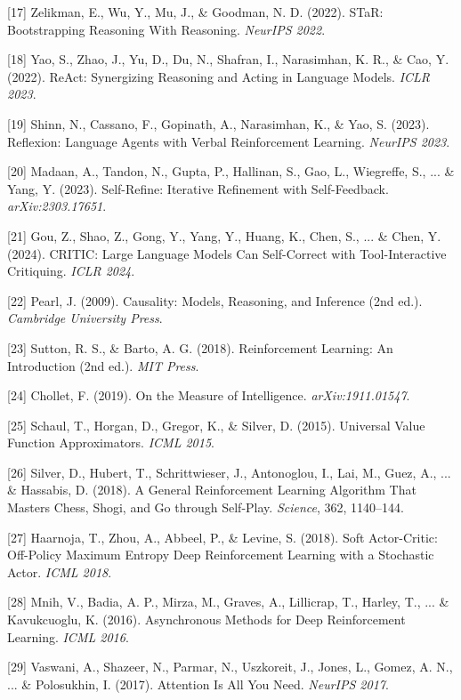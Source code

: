 \documentclass[11pt]{article}
\begin{document}
[17] Zelikman, E., Wu, Y., Mu, J., \& Goodman, N. D. (2022). STaR: Bootstrapping
    Reasoning With Reasoning. \textit{NeurIPS 2022}.

[18] Yao, S., Zhao, J., Yu, D., Du, N., Shafran, I., Narasimhan, K. R., \& Cao, Y.
    (2022). ReAct: Synergizing Reasoning and Acting in Language Models.
    \textit{ICLR 2023}.

[19] Shinn, N., Cassano, F., Gopinath, A., Narasimhan, K., \& Yao, S. (2023).
    Reflexion: Language Agents with Verbal Reinforcement Learning.
    \textit{NeurIPS 2023}.

[20] Madaan, A., Tandon, N., Gupta, P., Hallinan, S., Gao, L., Wiegreffe, S., ... \&
    Yang, Y. (2023). Self-Refine: Iterative Refinement with Self-Feedback.
    \textit{arXiv:2303.17651}.

[21] Gou, Z., Shao, Z., Gong, Y., Yang, Y., Huang, K., Chen, S., ... \& Chen, Y.
    (2024). CRITIC: Large Language Models Can Self-Correct with
    Tool-Interactive Critiquing. \textit{ICLR 2024}.

[22] Pearl, J. (2009). Causality: Models, Reasoning, and Inference (2nd ed.).
    \textit{Cambridge University Press}.

[23] Sutton, R. S., \& Barto, A. G. (2018). Reinforcement Learning: An
    Introduction (2nd ed.). \textit{MIT Press}.

[24] Chollet, F. (2019). On the Measure of Intelligence. \textit{arXiv:1911.01547}.

[25] Schaul, T., Horgan, D., Gregor, K., \& Silver, D. (2015). Universal Value
    Function Approximators. \textit{ICML 2015}.

[26] Silver, D., Hubert, T., Schrittwieser, J., Antonoglou, I., Lai, M., Guez,
    A., ... \& Hassabis, D. (2018). A General Reinforcement Learning Algorithm
    That Masters Chess, Shogi, and Go through Self-Play. \textit{Science}, 362,
    1140--144.

[27] Haarnoja, T., Zhou, A., Abbeel, P., \& Levine, S. (2018). Soft Actor-Critic:
    Off-Policy Maximum Entropy Deep Reinforcement Learning with a Stochastic
    Actor. \textit{ICML 2018}.

[28] Mnih, V., Badia, A. P., Mirza, M., Graves, A., Lillicrap, T., Harley, T.,
    ... \& Kavukcuoglu, K. (2016). Asynchronous Methods for Deep Reinforcement
    Learning. \textit{ICML 2016}.

[29] Vaswani, A., Shazeer, N., Parmar, N., Uszkoreit, J., Jones, L., Gomez,
    A. N., ... \& Polosukhin, I. (2017). Attention Is All You Need.
    \textit{NeurIPS 2017}.
\end{document}
